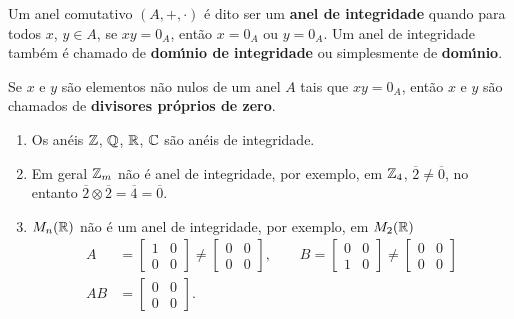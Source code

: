 \begin{definicao}
	Um anel comutativo $(A, + , \cdot)$ {\'e} dito ser um \textbf{anel de integridade} quando para todos
	$x$, $y \in A$, se $xy = 0_A$, ent{\~a}o $x = 0_A$ ou $y = 0_A$. Um anel de integridade tamb{\'e}m {\'e} chamado de \textbf{dom{\'\i}nio de integridade} ou simplesmente de \textbf{dom{\'\i}nio}.
\end{definicao}

\begin{observacao}
	Se $x$ e $y$ s{\~a}o elementos n{\~a}o nulos de um anel $A$ tais que $xy = 0_A$, ent{\~a}o $x$ e $y$ s{\~a}o chamados de \textbf{divisores pr{\'o}prios de zero}.
\end{observacao}


\begin{exemplos}
	\begin{enumerate}[label={\arabic*})]
		\item Os an{\'e}is $\mathbb{Z}$, $\mathbb{Q}$, $\mathbb{R}$, $\mathbb{C}$ s{\~a}o an{\'e}is de integridade.

		\item Em geral $\mathbb{Z}_m$ n{\~a}o {\'e} anel de integridade, por exemplo, em $\mathbb{Z}_4$, $\overline{2} \neq \overline{0}$, no entanto $\overline{2}\otimes \overline{2} = \overline{4} = \overline{0}$.

		\item $M_{n}(\mathbb{R})$ n{\~a}o {\'e} um anel de integridade, por exemplo, em $M_{2}(\mathbb{R})$
		\begin{align*}
			A &= \begin{bmatrix}
				1 & 0\\
				0 & 0
			\end{bmatrix} \neq \begin{bmatrix}
				0 & 0\\
				0 & 0
			\end{bmatrix},\qquad
			B = \begin{bmatrix}
				0 & 0\\
				1 & 0
			\end{bmatrix} \neq \begin{bmatrix}
				0 & 0\\
				0 & 0
			\end{bmatrix}\\
			AB & =\begin{bmatrix}
				0 & 0\\
				0 & 0
			\end{bmatrix}.
		\end{align*}


\end{enumerate}
\end{exemplos}

